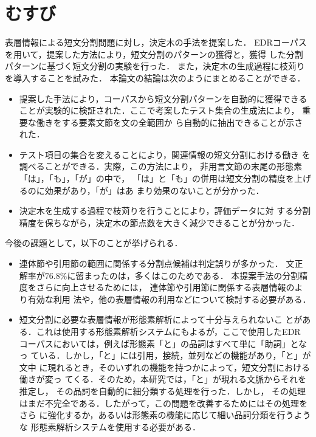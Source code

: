 \section{むすび}
 表層情報による短文分割問題に対し，決定木の手法を提案した．
EDRコーパスを用いて，提案した方法により，短文分割のパターンの獲得と，獲得
した分割パターンに基づく短文分割の実験を行った．
また，決定木の生成過程に枝苅りを導入することを試みた． 
本論文の結論は次のようにまとめることができる．
\begin{itemize}
\item  
提案した手法により，コーパスから短文分割パターンを自動的に獲得できる
ことが実験的に検証された．ここで考案したテスト集合の生成法により，
重要な働きをする要素文節を文の全範囲か
ら自動的に抽出できることが示された．
\item テスト項目の集合を変えることにより，関連情報の短文分割における働き
を調べることができる．実際，この方法により，
非用言文節の末尾の形態素「は」，「も」，「が」の中で，
「は」と「も」の併用は短文分割の精度を上げるのに効果があり，「が」はあ
まり効果のないことが分かった．
\item 決定木を生成する過程で枝苅りを行うことにより，評価データに対
する分割精度を保ちながら，決定木の節点数を大きく減少できることが分かった．
\end{itemize}
今後の課題として，以下のことが挙げられる．
\begin{itemize}
\item 連体節や引用節の範囲に関係する分割点候補は判定誤りが多かった．
文正解率が$76.8\%$に留まったのは，多くはこのためである．
本提案手法の分割精度をさらに向上させるためには，
連体節や引用節に関係する表層情報のより有効な利用
法や，他の表層情報の利用などについて検討する必要がある．
\item  短文分割に必要な表層情報が形態素解析によって十分与えられないこ
とがある．これは使用する形態素解析システムにもよるが，ここで使用したEDR
コーパスにおいては，例えば形態素「と」の品詞はすべて単に「助詞」となっ
ている．しかし，「と」には引用，接続，並列などの機能があり，「と」が文中
に現れるとき，そのいずれの機能を持つかによって，短文分割における働きが変っ
てくる．そのため，本研究では，「と」が現れる文脈からそれを推定し，
その品詞を自動的に細分類する処理を行った．しかし，
その処理
はまだ不完全である．したがって，この問題を改善するためにはその処理をさら
に強化するか，あるいは形態素の機能に応じて細い品詞分類を行うような
形態素解析システムを使用する必要がある．
\end{itemize}
